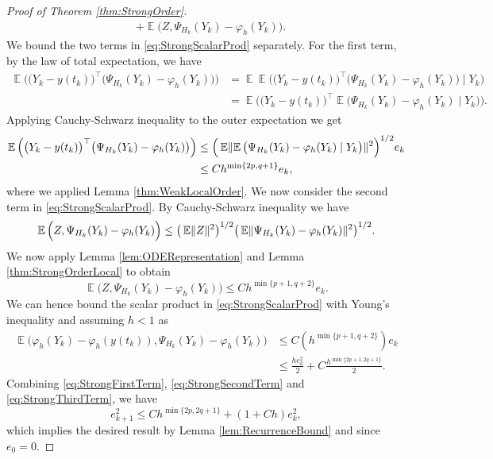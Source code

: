 \documentclass{siamart1116}
\numberwithin{theorem}{section}
\DeclarePairedDelimiter{\norm}{\|}{\|}
\renewcommand{\phi}{\varphi}
\newcommand{\E}{\operatorname{\mathbb{E}}}
\newcommand{\corr}[1]{{\color{bordeaux}#1}}
\begin{document}
\begin{proof}[Proof of Theorem \ref{thm:StrongOrder}]
\begin{equation}
\begin{aligned}
		&+ \E\Big(Z, \Psi_{H_k}(Y_k) - \phi_{h}(Y_k)\Big).
	\end{aligned}
	\end{equation}
	We bound the two terms in \eqref{eq:StrongScalarProd} separately. For the first term, by the law of total expectation, we have
	\begin{equation}
	\begin{aligned}
		\E\Big(\big(Y_k - y(t_k)\big)^\top \big(\Psi_{H_k}(Y_k) - \phi_{h}(Y_k)\big)\Big) &= \E\E\Big(\big(Y_k - y(t_k)\big)^\top \big(\Psi_{H_k}(Y_k) - \phi_{h}(Y_k)\big) \mid Y_k\Big)\\
		&= \E\Big(\big(Y_k - y(t_k)\big)^\top\E \big(\Psi_{H_k}(Y_k) - \phi_{h}(Y_k) \mid Y_k \big)\Big).
	\end{aligned}
	\end{equation}
	Applying Cauchy-Schwarz inequality to the outer expectation we get
	\corr{\begin{equation}
	\begin{aligned}
		\E\Big(\big(Y_k - y(t_k)\big)^\top \big(\Psi_{H_k}(Y_k) - \phi_{h}(Y_k)\big)\Big) &\leq \Big(\E\norm{\E\big(\Psi_{H_k}(Y_k) - \phi_{h}(Y_k) \mid Y_k\big)}^{2}\Big)^{1/2}e_k  \\
		&\leq  Ch^{\min\{2p, q+1\}}e_k,
	\end{aligned}
	\end{equation}}
	where we applied Lemma \ref{thm:WeakLocalOrder}. We now consider the second term in \eqref{eq:StrongScalarProd}. By Cauchy-Schwarz inequality we have
	\begin{equation}
		\E\Big(Z, \Psi_{H_k}(Y_k) - \phi_{h}(Y_k)\Big) \leq \big(\E\norm{Z}^{2}\big)^{1/2} \big(\E\norm{\Psi_{H_k}(Y_k) - \phi_{h}(Y_k)}^2\big)^{1/2}.
	\end{equation}
	We now apply Lemma \ref{lem:ODERepresentation} and Lemma \ref{thm:StrongOrderLocal} to obtain
	\corr{\begin{equation}
		\E\Big(Z, \Psi_{H_k}(Y_k) - \phi_{h}(Y_k)\Big) \leq C h^{\min\{p+1, q+2\}} e_k.
	\end{equation}}
	We can hence bound the scalar product in \eqref{eq:StrongScalarProd} with Young's inequality and assuming $h < 1$ as
	\corr{\begin{equation}\label{eq:StrongThirdTerm}
	\begin{aligned}
		\E\Big(\phi_{h}(Y_k) - \phi_{h}(y(t_k)), \Psi_{H_k}(Y_k) - \phi_{h}(Y_k)\Big) &\leq C(h^{\min\{p+1, q+2\}})e_k \\
		&\leq \frac{he_k^2}{2} + C\frac{h^{\min\{2p+1,2q+1\}}}{2}.
	\end{aligned}
	\end{equation}}
	Combining \eqref{eq:StrongFirstTerm}, \eqref{eq:StrongSecondTerm} and \eqref{eq:StrongThirdTerm}, we have
	\corr{\begin{equation}
		e_{k+1}^2 \leq Ch^{\min\{2p,2q + 1\}} + (1 + Ch)e_k^2,
	\end{equation}}
	which implies the desired result by Lemma \ref{lem:RecurrenceBound} and since $e_0 = 0$.
\end{proof}
\end{document}
